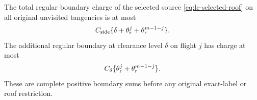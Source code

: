 \begin{lemma}
\label{lem:lc-selected-boundary}
The total regular boundary charge of the selected source
\eqref{eq:lc-selected-roof} on all original unvisited tangencies is
at most
\begin{equation}\label{eq:lc-old-boundary}
 C_{\rm side}\{\delta+\theta_{\rm r}^{j}
                             +\theta_{\rm r}^{m-1-j}\}.
\end{equation}
The additional regular boundary at clearance level $\delta$ on
flight $j$ has charge at most
\begin{equation}\label{eq:lc-new-boundary}
 C_{\delta}\{\theta_{\rm r}^{j}
                             +\theta_{\rm r}^{m-1-j}\}.
\end{equation}
These are complete positive boundary sums before any original
exact-label or roof restriction.
\end{lemma}
